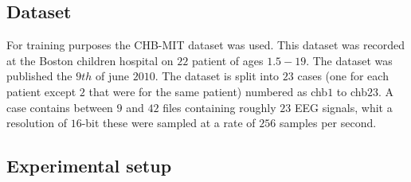 
\subsection{Dataset}
For training purposes the CHB-MIT dataset was used. This dataset was recorded at the Boston children hospital on $22$ patient of ages $1.5 - 19$. The dataset was published the $9th$ of june $2010$. The dataset is split into $23$ cases (one for each patient except $2$ that were for the same patient) numbered as chb$1$ to chb$23$. A case contains between $9$ and $42$ files containing roughly $23$ EEG signals, whit a resolution of $16$-bit these were sampled at a rate of $256$ samples per second.


\subsection{Experimental setup}

